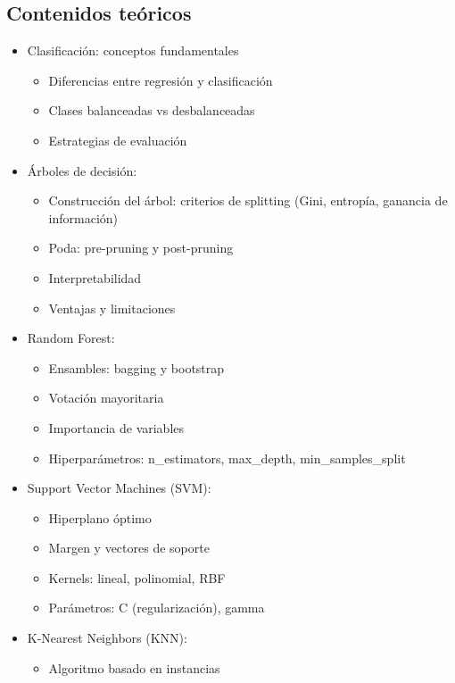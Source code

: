 \documentclass[a4paper,11pt]{article}
\begin{document}
\subsection{Contenidos teóricos}
\begin{itemize}[leftmargin=*]
    \item Clasificación: conceptos fundamentales
    \begin{itemize}
        \item Diferencias entre regresión y clasificación
        \item Clases balanceadas vs desbalanceadas
        \item Estrategias de evaluación
    \end{itemize}
    \item Árboles de decisión:
    \begin{itemize}
        \item Construcción del árbol: criterios de splitting (Gini, entropía, ganancia de información)
        \item Poda: pre-pruning y post-pruning
        \item Interpretabilidad
        \item Ventajas y limitaciones
    \end{itemize}
    \item Random Forest:
    \begin{itemize}
        \item Ensambles: bagging y bootstrap
        \item Votación mayoritaria
        \item Importancia de variables
        \item Hiperparámetros: n\_estimators, max\_depth, min\_samples\_split
    \end{itemize}
    \item Support Vector Machines (SVM):
    \begin{itemize}
        \item Hiperplano óptimo
        \item Margen y vectores de soporte
        \item Kernels: lineal, polinomial, RBF
        \item Parámetros: C (regularización), gamma
    \end{itemize}
    \item K-Nearest Neighbors (KNN):
    \begin{itemize}
        \item Algoritmo basado en instancias

\end{itemize}
\end{itemize}
\end{document}
